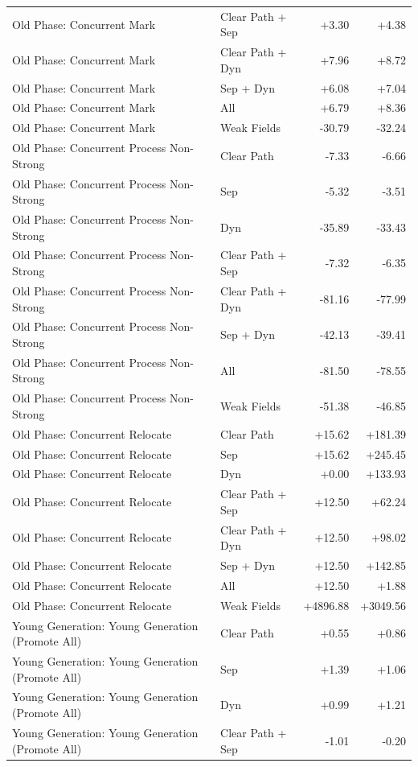 \begin{table}[t]
\begin{tabular}{llrr}
Old Phase: Concurrent Mark & Clear Path + Sep & +3.30 & +4.38 \\
Old Phase: Concurrent Mark & Clear Path + Dyn & +7.96 & +8.72 \\
Old Phase: Concurrent Mark & Sep + Dyn & +6.08 & +7.04 \\
Old Phase: Concurrent Mark & All & +6.79 & +8.36 \\
Old Phase: Concurrent Mark & Weak Fields & -30.79 & -32.24 \\
Old Phase: Concurrent Process Non-Strong & Clear Path & -7.33 & -6.66 \\
Old Phase: Concurrent Process Non-Strong & Sep & -5.32 & -3.51 \\
Old Phase: Concurrent Process Non-Strong & Dyn & -35.89 & -33.43 \\
Old Phase: Concurrent Process Non-Strong & Clear Path + Sep & -7.32 & -6.35 \\
Old Phase: Concurrent Process Non-Strong & Clear Path + Dyn & -81.16 & -77.99 \\
Old Phase: Concurrent Process Non-Strong & Sep + Dyn & -42.13 & -39.41 \\
Old Phase: Concurrent Process Non-Strong & All & -81.50 & -78.55 \\
Old Phase: Concurrent Process Non-Strong & Weak Fields & -51.38 & -46.85 \\
Old Phase: Concurrent Relocate & Clear Path & +15.62 & +181.39 \\
Old Phase: Concurrent Relocate & Sep & +15.62 & +245.45 \\
Old Phase: Concurrent Relocate & Dyn & +0.00 & +133.93 \\
Old Phase: Concurrent Relocate & Clear Path + Sep & +12.50 & +62.24 \\
Old Phase: Concurrent Relocate & Clear Path + Dyn & +12.50 & +98.02 \\
Old Phase: Concurrent Relocate & Sep + Dyn & +12.50 & +142.85 \\
Old Phase: Concurrent Relocate & All & +12.50 & +1.88 \\
Old Phase: Concurrent Relocate & Weak Fields & +4896.88 & +3049.56 \\
Young Generation: Young Generation (Promote All) & Clear Path & +0.55 & +0.86 \\
Young Generation: Young Generation (Promote All) & Sep & +1.39 & +1.06 \\
Young Generation: Young Generation (Promote All) & Dyn & +0.99 & +1.21 \\
Young Generation: Young Generation (Promote All) & Clear Path + Sep & -1.01 & -0.20 \\

\end{tabular}
\end{table}
